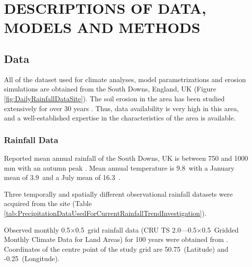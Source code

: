 \chapter{DESCRIPTIONS OF DATA, MODELS AND METHODS}
\label{sec:SIMULATIONDATAMODELSANDMETHODS}

\section{Data}
\label{sec:Data}

All of the dataset used for climate analyses, model parametrizations and erosion
simulations are obtained from the South Downs, England, UK (Figure
\ref{fig:DailyRainfallDataSite}). The soil erosion in the area has been studied
extensively for over 30 years
\citep{boardman1995-177,favis-mortlock1995-365,favis-mortlock1997-79,
favis-mortlock1998-141,boardman2001-346,boardman2003-176}. Thus, data
availability is very high in this area, and a well-established expertise in the
characteristics of the area is available.

\subsection{Rainfall Data}
\label{sec:RainfallData}

Reported mean annual rainfall of the South Downs, UK is between 750 and 1000 mm
with an autumn peak \citep{potts1983-88}. Mean annual temperature is
9.8\textcelsius\ with a January mean of 3.9\textcelsius\ and a July mean of
16.3\textcelsius\ \citep{potts1983-88}.

Three temporally and spatially different observational rainfall datasets were
acquired from the site (Table
\ref{tab:PrecipitationDataUsedForCurrentRainfallTrendInvestigation}).

Observed monthly 0.5\textdegree$\times$0.5\textdegree\ grid rainfall data (CRU
TS 2.0---0.5\textdegree$\times$0.5\textdegree\ Gridded Monthly Climate Data for
Land Areas) for 100 years were obtained from \citet{mitchell2004-a}. Coordinates
of the centre point of the study grid are 50.75\textdegree\ (Latitude) and
-0.25\textdegree\ (Longitude).

